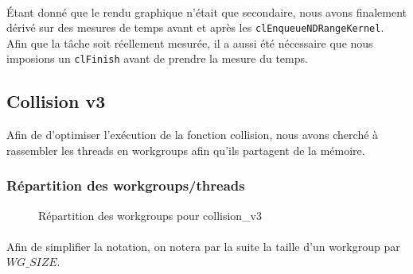\documentclass{article}
\begin{document}
\paragraph{}
Étant donné que le rendu graphique n'était que secondaire, nous avons finalement
dérivé sur des mesures de temps avant et après les
\verb!clEnqueueNDRangeKernel!. Afin que la tâche soit réellement mesurée, il
a aussi été nécessaire que nous imposions un \verb!clFinish! avant de prendre
la mesure du temps.

\subsection{Collision v3}
Afin de d'optimiser l'exécution de la fonction collision, nous avons cherché à
rassembler les threads en workgroups afin qu'ils partagent de la mémoire.

\subsubsection{Répartition des workgroups/threads}
\begin{figure}[p]
  \caption{Répartition des workgroups pour collision\_v3}
  \label{collision-v3}
\end{figure}
\paragraph{}
Afin de simplifier la notation, on notera par la suite la taille d'un
workgroup par $WG\_SIZE$.
\end{document}
